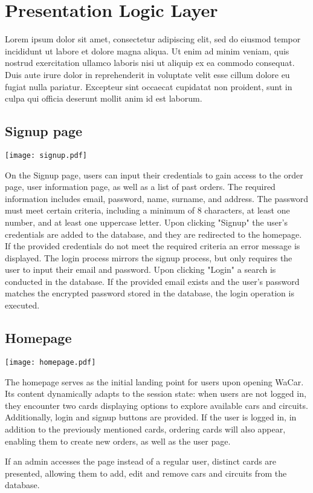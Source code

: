 \section{Presentation Logic Layer}


Lorem ipsum dolor sit amet, consectetur adipiscing elit, sed do eiusmod tempor incididunt ut labore et dolore magna aliqua. Ut enim ad minim veniam, quis nostrud exercitation ullamco laboris nisi ut aliquip ex ea commodo consequat. Duis aute irure dolor in reprehenderit in voluptate velit esse cillum dolore eu fugiat nulla pariatur. Excepteur sint occaecat cupidatat non proident, sunt in culpa qui officia deserunt mollit anim id est laborum.

\subsection{Signup page}


\texttt{[image: signup.pdf]}

On the Signup page, users can input their credentials to gain access to the order page, user information page, as well as a list of past orders.
The required information includes email, password, name, surname, and address. The password must meet certain criteria, including a minimum of 8 characters, at least one number, and at least one uppercase letter. 
Upon clicking "Signup" the user's credentials are added to the database, and they are redirected to the homepage.
If the provided credentials do not meet the required criteria an error message is displayed.
The login process mirrors the signup process, but only requires the user to input their email and password. Upon clicking "Login" a search is conducted in the database. 
If the provided email exists and the user's password matches the encrypted password stored in the database, the login operation is executed.

\subsection{Homepage}


\texttt{[image: homepage.pdf]}

The homepage serves as the initial landing point for users upon opening WaCar. Its content dynamically adapts to the session state: when users are not logged in, 
they encounter two cards displaying options to explore available cars and circuits. Additionally, login and signup buttons are provided.
If the user is logged in, in addition to the previously mentioned cards, ordering cards will also appear, enabling them to create new orders, as well as the user page.

If an admin accesses the page instead of a regular user, distinct cards are presented, allowing them to add, edit and remove cars and circuits from the database.